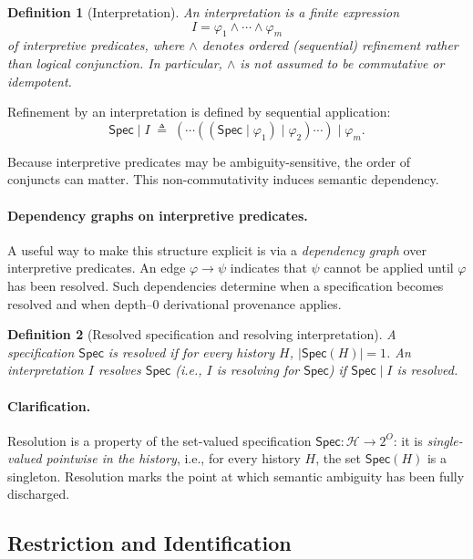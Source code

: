 \documentclass[acmsmall,nonacm]{acmart}
\newtheorem{definition}{Definition}
\theoremstyle{remark}
\numberwithin{definition}{section}
\numberwithin{theorem}{section}
\numberwithin{lemma}{section}
\numberwithin{corollary}{section}
\numberwithin{remark}{section}
\numberwithin{example}{section}
\numberwithin{observation}{section}
\numberwithin{assumption}{section}
\newcommand{\Hist}{\mathcal{H}}
\newcommand{\Spec}{\mathsf{Spec}}
\begin{document}
\begin{definition}[Interpretation]
An \emph{interpretation} is a finite expression
\[
  I = \varphi_1 \wedge \cdots \wedge \varphi_m
\]
of interpretive predicates, where $\wedge$ denotes \emph{ordered (sequential)
refinement} rather than logical conjunction.
In particular, $\wedge$ is not assumed to be commutative or idempotent.
\end{definition}

Refinement by an interpretation is defined by sequential application:
\[
  \Spec \mid I
  \;\triangleq\;
  (\cdots((\Spec \mid \varphi_1)\mid \varphi_2)\cdots)\mid \varphi_m .
\]

Because interpretive predicates may be ambiguity-sensitive, the order of conjuncts
can matter.
This non-commutativity induces semantic dependency.


\paragraph{Dependency graphs on interpretive predicates.}
A useful way to make this structure explicit is via a \emph{dependency graph}
over interpretive predicates.
An edge $\varphi \rightarrow \psi$ indicates that $\psi$ cannot be applied until
$\varphi$ has been resolved.
Such dependencies determine when a specification becomes resolved and when
depth--0 derivational provenance applies.

\begin{definition}[Resolved specification and resolving interpretation]
A specification $\Spec$ is \emph{resolved} if for every history $H$, $|\Spec(H)| = 1$.
An interpretation $I$ \emph{resolves} $\Spec$ (i.e., $I$ is \emph{resolving for} $\Spec$) if $\Spec \mid I$ is resolved.
\end{definition}

\paragraph{Clarification.}
Resolution is a property of the set-valued specification $\Spec:\Hist\to 2^O$:
it is \emph{single-valued pointwise in the history}, i.e., for every history $H$,
the set $\Spec(H)$ is a singleton.
Resolution marks the point at which semantic ambiguity has been fully discharged.

\subsection{Restriction and Identification}
\end{document}
